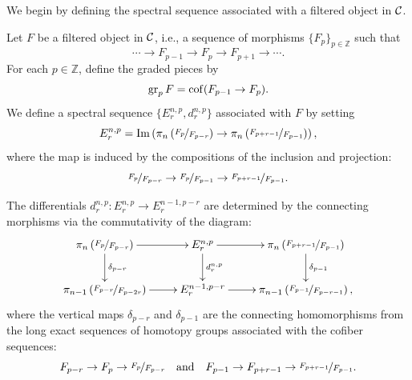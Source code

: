We begin by defining the spectral sequence associated with a filtered object in $\mathcal{C}$.

\begin{defn}{\cite[Def.\ 1.2.2.9]{Lur17}}\label{def:SS_Fil}
    Let $F$ be a filtered object in $\mathcal{C}$, i.e., a sequence of morphisms $\{ F_p \}_{p\in \mathbb{Z}}$ such that
    \begin{equation}
        \cdots \to F_{p-1} \to F_p \to F_{p+1} \to \cdots.
    \end{equation}
    For each $p \in \mathbb{Z}$, define the graded pieces by
    \begin{equation}
        \operatorname{gr}_p F = \operatorname{cof}(F_{p-1} \to F_p).
    \end{equation}
    We define a spectral sequence $\{ E_r^{n,p}, d_r^{n,p} \}$ associated with $F$ by setting
    \begin{equation}\label{eq:Er_Fil}
        E_r^{n,p} = \operatorname{Im}\left( \pi_n\left( \nicefrac{F_p}{F_{p - r}} \right) \to \pi_n\left( \nicefrac{F_{p + r - 1}}{F_{p - 1}} \right) \right),
    \end{equation}
    where the map is induced by the compositions of the inclusion and projection:
    \begin{equation}\label{eq:factorization}
        \nicefrac{F_p}{F_{p - r}} \to \nicefrac{F_p}{F_{p - 1}} \to \nicefrac{F_{p + r - 1}}{F_{p - 1}}.
    \end{equation}

    The differentials $d_r^{n,p}\colon E_r^{n,p} \to E_r^{n-1, p - r}$ are determined by the connecting morphisms via the commutativity of the diagram:
    \begin{equation}\label{eq:diff_Fil}
        \xymatrix{
        \pi_n\left( \nicefrac{F_p}{F_{p - r}} \right) \ar[r]\ar[d]^{\delta_{p - r}} & E_r^{n,p} \ar[r]\ar[d]^{d_r^{n,p}} & \pi_n\left( \nicefrac{F_{p + r - 1}}{F_{p - 1}} \right) \ar[d]^{\delta_{p - 1}}\\
        \pi_{n - 1}\left( \nicefrac{F_{p - r}}{F_{p - 2r}} \right) \ar[r] & E_r^{n - 1, p - r} \ar[r] & \pi_{n - 1}\left( \nicefrac{F_{p - 1}}{F_{p - r - 1}} \right),
        }
    \end{equation}
    where the vertical maps $\delta_{p - r}$ and $\delta_{p - 1}$ are the connecting homomorphisms from the long exact sequences of homotopy groups associated with the cofiber sequences:
    \begin{equation}
        F_{p - r} \to F_p \to \nicefrac{F_p}{F_{p - r}} \quad \text{and} \quad F_{p - 1} \to F_{p + r - 1} \to \nicefrac{F_{p + r - 1}}{F_{p - 1}}.
    \end{equation}
\end{defn}

